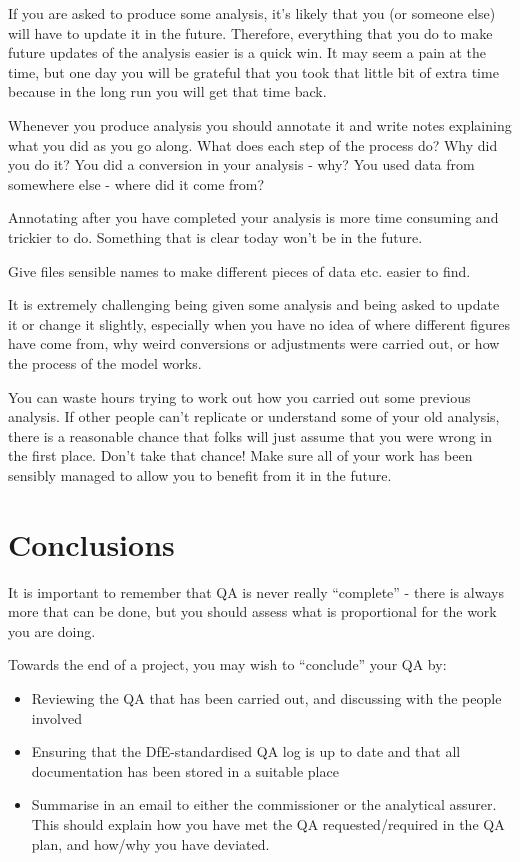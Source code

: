 \documentclass[
]{article}
\begin{document}
If you are asked to produce some analysis, it's likely that you (or someone else) will have to update it in the future. Therefore, everything that you do to make future updates of the analysis easier is a quick win. It may seem a pain at the time, but one day you will be grateful that you took that little bit of extra time because in the long run you will get that time back.

Whenever you produce analysis you should annotate it and write notes explaining what you did as you go along. What does each step of the process do? Why did you do it? You did a conversion in your analysis - why? You used data from somewhere else - where did it come from?

Annotating after you have completed your analysis is more time consuming and trickier to do. Something that is clear today won't be in the future.

Give files sensible names to make different pieces of data etc. easier to find.

It is extremely challenging being given some analysis and being asked to update it or change it slightly, especially when you have no idea of where different figures have come from, why weird conversions or adjustments were carried out, or how the process of the model works.

You can waste hours trying to work out how you carried out some previous analysis. If other people can't replicate or understand some of your old analysis, there is a reasonable chance that folks will just assume that you were wrong in the first place. Don't take that chance! Make sure all of your work has been sensibly managed to allow you to benefit from it in the future.

\hypertarget{conclusions}{%
\section{Conclusions}\label{conclusions}}

It is important to remember that QA is never really ``complete'' - there is always more that can be done, but you should assess what is proportional for the work you are doing.

Towards the end of a project, you may wish to ``conclude'' your QA by:

\begin{itemize}
\item
  Reviewing the QA that has been carried out, and discussing with the people involved
\item
  Ensuring that the DfE-standardised QA log is up to date and that all documentation has been stored in a suitable place
\item
  Summarise in an email to either the commissioner or the analytical assurer. This should explain how you have met the QA requested/required in the QA plan, and how/why you have deviated.
\end{itemize}
\end{document}
